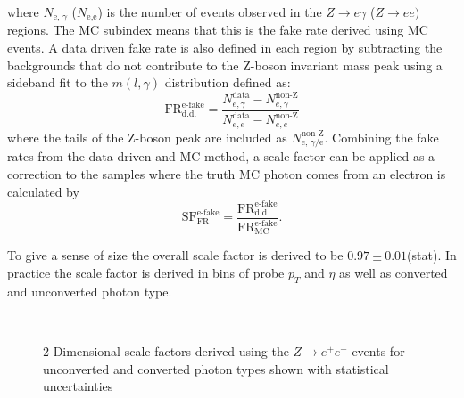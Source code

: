 where $N_\text{e, $\gamma$}$ ($N_\text{e,e}$) is the number of events observed in the $Z\rightarrow e \gamma$ ($Z\rightarrow ee)$ regions.  The MC subindex means that this is the fake rate derived using MC events.  A data driven fake rate is also defined in each region by subtracting the backgrounds that do not contribute to the Z-boson invariant mass peak using a sideband fit to the $m(l,\gamma)$ distribution defined as:
\[ \text{FR}_{\text{d.d.}}^{\text{e-fake}} = \frac{N_{e,\gamma}^{\text{data}}-N_{e,\gamma}^{\text{non-Z}}}{N_{e,e}^{\text{data}}-N_{e,e}^{\text{non-Z}}} \]
where the tails of the Z-boson peak are included as $N_\text{e, $\gamma$/e}^\text{non-Z}$.  Combining the fake rates from the data driven and MC method, a scale factor can be applied as a correction to the samples where the truth MC photon comes from an electron is calculated by
\[  \text{SF}_{\text{FR}}^{\text{e-fake}} =\frac{ \text{FR}_{\text{d.d.}}^{\text{e-fake}}}{ \text{FR}_{\text{MC}}^{\text{e-fake}} }.\]

To give a sense of size the overall scale factor is derived to be $0.97 \pm 0.01$(stat).  In practice the scale factor is derived in bins of probe $p_T$ and $\eta$ as well as converted and unconverted photon type.  
\begin{figure}[h!]
\centering
{}\\
\caption{2-Dimensional scale factors derived using the $Z\rightarrow e^+ e^- $ events for unconverted and converted photon types shown with statistical uncertainties}
\label{fig:EGammaSFs}
\end{figure}

